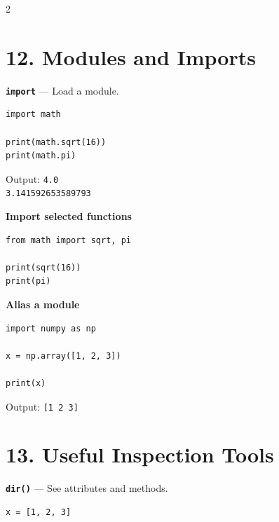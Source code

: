 \documentclass[10pt,a4paper]{article}
\begin{document}
\begin{multicols}{2}
\raggedcolumns

\section*{12. Modules and Imports}

\begin{card}
\textbf{\texttt{import}} --- Load a module.

\begin{lstlisting}[style=pythonstyle]
import math

print(math.sqrt(16))
print(math.pi)
\end{lstlisting}

Output:
\texttt{4.0}\\
\texttt{3.141592653589793}
\end{card}

\begin{card}
\textbf{Import selected functions}

\begin{lstlisting}[style=pythonstyle]
from math import sqrt, pi

print(sqrt(16))
print(pi)
\end{lstlisting}
\end{card}

\begin{card}
\textbf{Alias a module}

\begin{lstlisting}[style=pythonstyle]
import numpy as np

x = np.array([1, 2, 3])

print(x)
\end{lstlisting}

Output:
\texttt{[1 2 3]}
\end{card}

\section*{13. Useful Inspection Tools}

\begin{card}
\textbf{\texttt{dir()}} --- See attributes and methods.

\begin{lstlisting}[style=pythonstyle]
x = [1, 2, 3]


\end{lstlisting}
\end{card}
\end{multicols}
\end{document}
